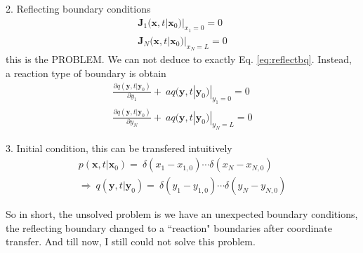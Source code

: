 \documentclass[12pt,a4paper]{article}
\begin{document}
2. Reflecting boundary conditions
\begin{eqnarray}
    \mathbf{J}_{1}(\mathbf{x},t|\mathbf{x}_0)|_{x_1=0} = 0 \\
    \mathbf{J}_{N}(\mathbf{x},t|\mathbf{x}_0)|_{x_N=L} = 0
\end{eqnarray}
this is the PROBLEM. We can not deduce to exactly Eq. \ref{eq:reflectbq}.
Instead, a reaction type of boundary is obtain
\begin{eqnarray}
    \frac{\partial q(\mathbf{y},t|\mathbf{y}_0)}{\partial y_1} +  \
    aq(\mathbf{y},t|\mathbf{y}_0)|_{y_1 = 0} = 0 \\
    \frac{\partial q(\mathbf{y},t|\mathbf{y}_0)}{\partial y_N} +  \
    aq(\mathbf{y},t|\mathbf{y}_0)|_{y_N = L} = 0
\end{eqnarray}

3. Initial condition, this can be transfered intuitively 
\begin{eqnarray}
    p(\mathbf{x}, t|\mathbf{x}_0) = \
    \delta(x_1 - x_{1,0})\cdots \delta(x_N - x_{N,0}) \\
    \Rightarrow \
    q(\mathbf{y}, t|\mathbf{y}_0) = \
    \delta(y_1 - y_{1,0})\cdots\delta(y_N - y_{N,0})
\end{eqnarray}

So in short, the unsolved problem is we have an unexpected boundary conditions,
the reflecting boundary changed to a ``reaction" boundaries after coordinate
transfer. And till now, I still could not solve this problem.
\end{document}
